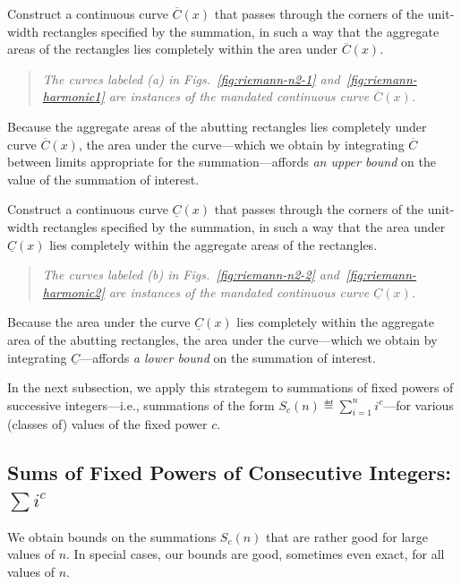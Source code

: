%
Construct a continuous curve $\overline{C}(x)$ that passes through the
corners of the unit-width rectangles specified by the summation, in
such a way that the aggregate areas of the rectangles lies completely
within the area under $\overline{C}(x)$.
\begin{quote}
{\em
The curves labeled (a) in Figs.~\ref{fig:riemann-n2-1}
and~\ref{fig:riemann-harmonic1} are instances of the mandated
continuous curve $\overline{C}(x)$.
}
\end{quote}
Because the aggregate areas of the abutting rectangles lies completely
under curve $\overline{C}(x)$, the area under the curve---which we
obtain by integrating $\overline{C}$ between limits appropriate for
the summation---affords {\em an upper bound} on the value of the
summation of interest.

\medskip

%
Construct a continuous curve $\underline{C}(x)$ that passes through
the corners of the unit-width rectangles
specified by the summation, in such a way that the area under
$\underline{C}(x)$ lies completely within the aggregate areas of the 
rectangles.
\begin{quote}
{\em The curves labeled (b) in Figs.~\ref{fig:riemann-n2-2}
  and~\ref{fig:riemann-harmonic2} are instances of the mandated
  continuous curve $\underline{C}(x)$.  }
\end{quote}
Because the area under the curve $\underline{C}(x)$ lies completely
within the aggregate area of the abutting rectangles, the area under
the curve---which we obtain by integrating $\underline{C}$---affords
{\em a lower bound} on the summation of interest.

\medskip

In the next subsection, we apply this strategem to summations of fixed
powers of successive integers---i.e., summations of the form
$\displaystyle S_c(n) \eqdef \sum_{i=1}^n i^c$---for various (classes
of) values of the fixed power $c$.


\subsection{Sums of Fixed Powers of Consecutive Integers: $\sum i^c$}
\label{sec:sum-of-i2c}

We obtain bounds on the summations $S_c(n)$ that are rather good for
large values of $n$.  In special cases, our bounds are good, sometimes
even exact, for all values of $n$.

